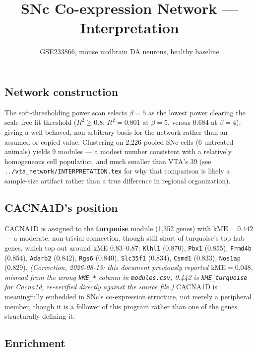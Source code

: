 \documentclass[11pt]{article}
\title{SNc Co-expression Network --- Interpretation}
\author{GSE233866, mouse midbrain DA neurons, healthy baseline}
\date{}
\begin{document}
\maketitle

\subsection*{Network construction}

The soft-thresholding power scan selects $\beta=5$ as the lowest power clearing
the scale-free fit threshold ($R^2 \geq 0.8$; $R^2=0.801$ at $\beta=5$, versus
$0.684$ at $\beta=4$), giving a well-behaved, non-arbitrary basis for the
network rather than an assumed or copied value. Clustering on 2{,}226 pooled
SNc cells (6 untreated animals) yields 9 modules --- a modest number
consistent with a relatively homogeneous cell population, and much smaller
than VTA's 39 (see \texttt{../vta\_network/INTERPRETATION.tex} for why that
comparison is likely a sample-size artifact rather than a true difference in
regional organization).

\subsection*{CACNA1D's position}

CACNA1D is assigned to the \textbf{turquoise} module (1{,}352 genes) with
$\mathrm{kME}=0.442$ --- a moderate, non-trivial connection, though still
short of turquoise's top hub genes, which top out around kME
$0.83$--$0.87$: \texttt{Klhl1} (0.870), \texttt{Pbx1} (0.855),
\texttt{Frmd4b} (0.854), \texttt{Adarb2} (0.842), \texttt{Rgs6} (0.840),
\texttt{Slc35f1} (0.834), \texttt{Csmd1} (0.833), \texttt{Nos1ap} (0.829).
\emph{(Correction, 2026-08-13: this document previously reported
$\mathrm{kME}=0.048$, misread from the wrong \texttt{kME\_*} column
in \texttt{modules.csv}; 0.442 is \texttt{kME\_turquoise} for Cacna1d,
re-verified directly against the source file.)} CACNA1D is meaningfully
embedded in SNc's co-expression structure, not merely a peripheral member,
though it is a follower of this program rather than one of the genes
structurally defining it.

\subsection*{Enrichment}
\end{document}
